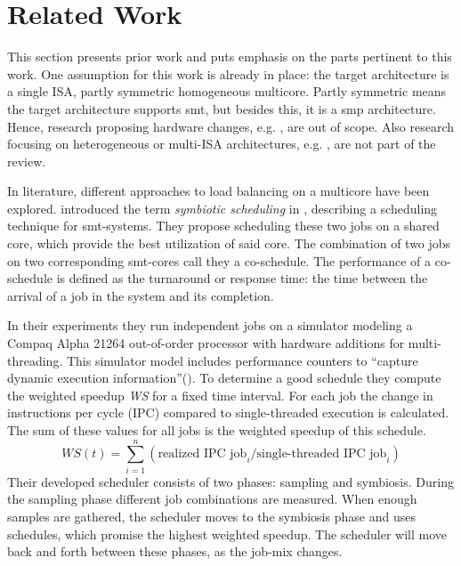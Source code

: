 \section{Related Work}
\label{state:related}

This section presents prior work and puts emphasis on the parts pertinent to
this work.
One assumption for this work is already in place:
the target architecture is a single ISA, partly symmetric homogeneous
multicore.
Partly symmetric means the target architecture supports \gls{smt},
but besides this, it is a \gls{smp} architecture.
Hence, research proposing hardware changes, e.g. \cite{cruz_dynamic_2014},
are out of scope.
Also research focusing on heterogeneous or multi-ISA architectures, e.g.
\cite{sarma_smartbalance_2015}, are not part of the review.


\begin{comment}
  Structure for the description of related work:
    * Assumptions
    * Concept
    * Relevant contribution
    * Result
    * Deficits

  Alternative: aspects of the thesis in related work;
\end{comment}

In literature, different approaches to load balancing on a multicore have been
explored.
\citeauthor{snavely_symbiotic_2000} introduced the term \emph{symbiotic
scheduling} in \cite{snavely_symbiotic_2000}, describing a scheduling technique
for \gls{smt}-systems.
They propose scheduling these two jobs on a shared core, which provide the best
utilization of said core.
The combination of two jobs on two corresponding \gls{smt}-cores call they a
co-schedule.
The performance of a co-schedule is defined as the turnaround or response time:
the time between the arrival of a job in the system and its completion.

In their experiments they run independent jobs on a simulator modeling a Compaq
Alpha 21264 out-of-order processor with hardware additions for multi-threading.
This simulator model includes performance counters to ``capture dynamic execution
information''(\autocite[236]{snavely_symbiotic_2000}).
To determine a good schedule they compute the weighted speedup \textit{WS} for
a fixed time interval.
For each job the change in instructions per cycle (IPC) compared to
single-threaded execution is calculated.
The sum of these values for all jobs is the weighted speedup of this
schedule.
$$ WS(t) = \sum_{i=1}^n (\text{realized IPC job}_i / \text{single-threaded IPC
job}_i)$$
Their developed scheduler consists of two phases: sampling and symbiosis.
During the sampling phase different job combinations are measured.
When enough samples are gathered, the scheduler moves to the symbiosis phase
and uses schedules, which promise the highest weighted speedup.
The scheduler will move back and forth between these phases, as the job-mix
changes.

